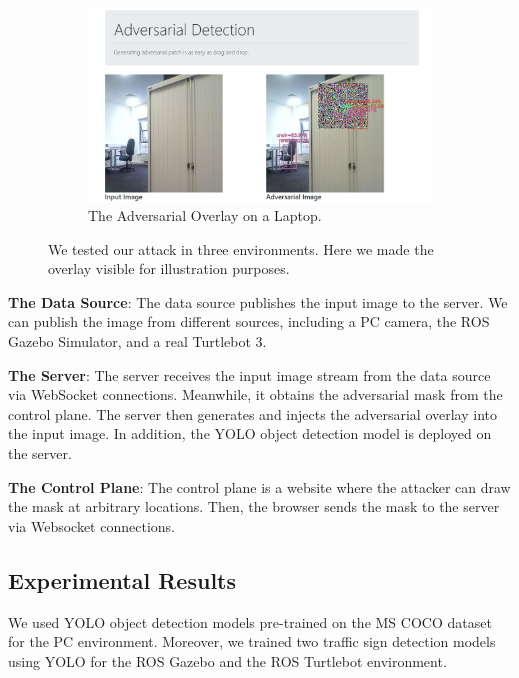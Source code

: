 \begin{figure}[H]\ContinuedFloat
\centering
\begin{subfigure}[b]{\textwidth}
    \centering
    \includegraphics[width=\textwidth]{figures/chapter_detection/detection/pc.png}
    \caption{The Adversarial Overlay on a Laptop.}
    \label{fig:pc}
\end{subfigure}
\caption{We tested our attack in three environments. Here we made the overlay visible for illustration purposes.}
\label{fig.adv_detect_demo}
\end{figure}

\textbf{The Data Source}: The data source publishes the input image to the server. We can publish the image from different sources, including a PC camera, the ROS Gazebo Simulator, and a real Turtlebot 3.

\textbf{The Server}: The server receives the input image stream from the data source via WebSocket connections. Meanwhile, it obtains the adversarial mask from the control plane. The server then generates and injects the adversarial overlay into the input image. In addition, the YOLO object detection model is deployed on the server.

\textbf{The Control Plane}: The control plane is a website where the attacker can draw the mask at arbitrary locations. Then, the browser sends the mask to the server via Websocket connections.

\subsection{Experimental Results}

We used YOLO object detection models pre-trained on the MS COCO dataset for the PC environment. Moreover, we trained two traffic sign detection models using YOLO for the ROS Gazebo and the ROS Turtlebot environment. 

